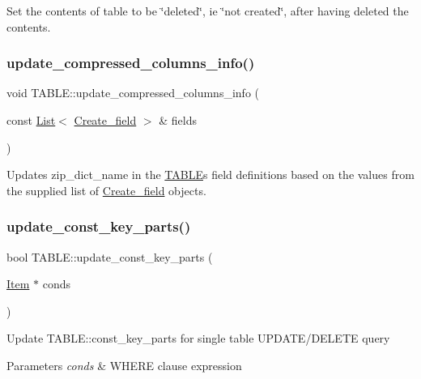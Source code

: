 Set the contents of table to be \char`\"{}deleted\char`\"{}, ie \char`\"{}not created\char`\"{}, after having deleted the contents. \mbox{\label{structTABLE_a367a4243ea58d8fe6d1df7c27fd8741b}} 
\subsubsection{\texorpdfstring{update\+\_\+compressed\+\_\+columns\+\_\+info()}{update\_compressed\_columns\_info()}}
{\footnotesize\ttfamily void T\+A\+B\+L\+E\+::update\+\_\+compressed\+\_\+columns\+\_\+info (\begin{DoxyParamCaption}\item[{const \mbox{\hyperlink{classList}{List}}$<$ \mbox{\hyperlink{classCreate__field}{Create\+\_\+field}} $>$ \&}]{fields }\end{DoxyParamCaption})}

Updates zip\+\_\+dict\+\_\+name in the \mbox{\hyperlink{structTABLE}{T\+A\+B\+LE}}\textquotesingle{}s field definitions based on the values from the supplied list of \mbox{\hyperlink{classCreate__field}{Create\+\_\+field}} objects. \mbox{\label{structTABLE_aded373553a351dbb53ae979e21aacd48}} 
\subsubsection{\texorpdfstring{update\+\_\+const\+\_\+key\+\_\+parts()}{update\_const\_key\_parts()}}
{\footnotesize\ttfamily bool T\+A\+B\+L\+E\+::update\+\_\+const\+\_\+key\+\_\+parts (\begin{DoxyParamCaption}\item[{\mbox{\hyperlink{classItem}{Item}} $\ast$}]{conds }\end{DoxyParamCaption})}

Update T\+A\+B\+L\+E\+::const\+\_\+key\+\_\+parts for single table U\+P\+D\+A\+T\+E/\+D\+E\+L\+E\+TE query


\begin{DoxyParams}{Parameters}
{\em conds} & W\+H\+E\+RE clause expression\\
\hline
\end{DoxyParams}

